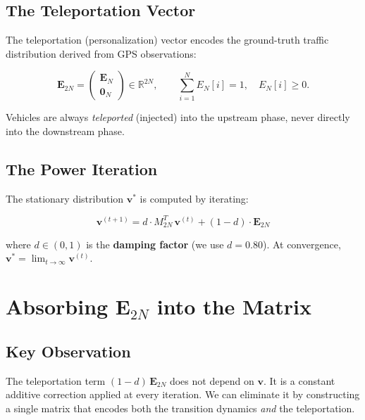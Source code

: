 \documentclass[11pt,a4paper]{article}
\theoremstyle{definition}
\begin{document}
\subsection{The Teleportation Vector}

The teleportation (personalization) vector encodes the ground-truth traffic
distribution derived from GPS observations:

\begin{equation}\label{eq:E2N}
\bm{E}_{2N} =
\begin{pmatrix}
\bm{E}_N \\[2pt]
\bm{0}_N
\end{pmatrix}
\in \mathbb{R}^{2N}, \qquad
\sum_{i=1}^{N} E_N[i] = 1, \quad E_N[i] \geq 0.
\end{equation}

Vehicles are always \emph{teleported} (injected) into the upstream phase,
never directly into the downstream phase.

\subsection{The Power Iteration}

The stationary distribution $\bm{v}^*$ is computed by iterating:

\begin{equation}\label{eq:power}
\boxed{
\bm{v}^{(t+1)} = d \cdot M_{2N}^T \, \bm{v}^{(t)}
                + (1-d) \cdot \bm{E}_{2N}
}
\end{equation}

where $d \in (0,1)$ is the \textbf{damping factor} (we use $d = 0.80$).
At convergence, $\bm{v}^* = \lim_{t\to\infty} \bm{v}^{(t)}$.

\section{\texorpdfstring{Absorbing $\bm{E}_{2N}$ into the Matrix}{Absorbing E\_2N into the Matrix}}

\subsection{Key Observation}

The teleportation term $(1-d)\,\bm{E}_{2N}$ does not depend on $\bm{v}$.
It is a constant additive correction applied at every iteration.  We can
eliminate it by constructing a single matrix that encodes both the
transition dynamics \emph{and} the teleportation.
\end{document}
